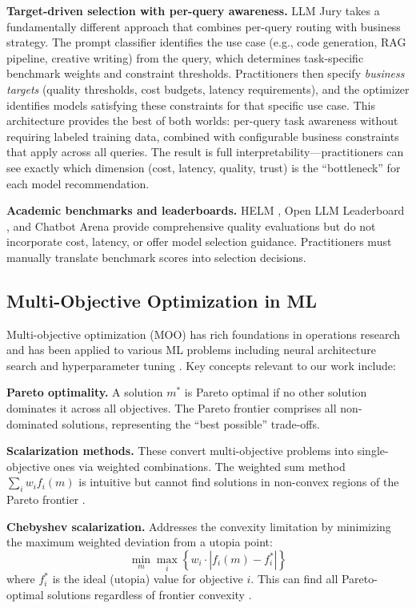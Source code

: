 \documentclass[11pt,a4paper]{article}
\begin{document}
\textbf{Target-driven selection with per-query awareness.} LLM Jury takes a fundamentally different approach that combines per-query routing with business strategy. The prompt classifier identifies the use case (e.g., code generation, RAG pipeline, creative writing) from the query, which determines task-specific benchmark weights and constraint thresholds. Practitioners then specify \textit{business targets} (quality thresholds, cost budgets, latency requirements), and the optimizer identifies models satisfying these constraints for that specific use case. This architecture provides the best of both worlds: per-query task awareness without requiring labeled training data, combined with configurable business constraints that apply across all queries. The result is full interpretability---practitioners can see exactly which dimension (cost, latency, quality, trust) is the ``bottleneck'' for each model recommendation.

\textbf{Academic benchmarks and leaderboards.} HELM \cite{liang2022holistic}, Open LLM Leaderboard \cite{huggingface2023}, and Chatbot Arena \cite{zheng2023judging} provide comprehensive quality evaluations but do not incorporate cost, latency, or offer model selection guidance. Practitioners must manually translate benchmark scores into selection decisions.

\subsection{Multi-Objective Optimization in ML}

Multi-objective optimization (MOO) has rich foundations in operations research \cite{miettinen1999nonlinear} and has been applied to various ML problems including neural architecture search \cite{elsken2019neural} and hyperparameter tuning \cite{karl2022multi}. Key concepts relevant to our work include:

\textbf{Pareto optimality.} A solution $m^*$ is Pareto optimal if no other solution dominates it across all objectives. The Pareto frontier comprises all non-dominated solutions, representing the ``best possible'' trade-offs.

\textbf{Scalarization methods.} These convert multi-objective problems into single-objective ones via weighted combinations. The weighted sum method $\sum_i w_i f_i(m)$ is intuitive but cannot find solutions in non-convex regions of the Pareto frontier \cite{das1997closer}.

\textbf{Chebyshev scalarization.} Addresses the convexity limitation by minimizing the maximum weighted deviation from a utopia point:
\begin{equation}
\min_{m} \max_{i} \left\{ w_i \cdot |f_i(m) - f_i^*| \right\}
\end{equation}
where $f_i^*$ is the ideal (utopia) value for objective $i$. This can find all Pareto-optimal solutions regardless of frontier convexity \cite{bowman1976relationship}.
\end{document}
